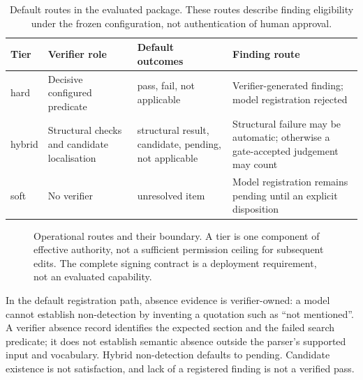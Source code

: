 \begin{table}[!ht]
\caption{Default routes in the evaluated package. These routes describe finding eligibility under the frozen configuration, not authentication of human approval.}
\label{tab:tiers}
\centering\small
\begin{tabularx}{\textwidth}{@{}lXXX@{}}
\toprule
Tier & Verifier role & Default outcomes & Finding route \\
\midrule
hard & Decisive configured predicate & pass, fail, not applicable & Verifier-generated finding; model registration rejected \\
 hybrid & Structural checks and candidate localisation & structural result, candidate, pending, not applicable & Structural failure may be automatic; otherwise a gate-accepted judgement may count \\
soft & No verifier & unresolved item & Model registration remains pending until an explicit disposition \\
\bottomrule
\end{tabularx}
\end{table}

\begin{figure}[!ht]
\centering
{}
\caption{Operational routes and their boundary. A tier is one component of effective authority, not a sufficient permission ceiling for subsequent edits. The complete signing contract is a deployment requirement, not an evaluated capability.}
\label{fig:type}
\end{figure}

In the default registration path, absence evidence is verifier-owned: a model cannot establish non-detection by inventing a quotation such as ``not mentioned''. A verifier absence record identifies the expected section and the failed search predicate; it does not establish semantic absence outside the parser's supported input and vocabulary. Hybrid non-detection defaults to pending. Candidate existence is not satisfaction, and lack of a registered finding is not a verified pass.

